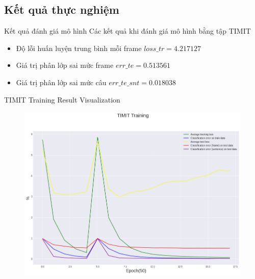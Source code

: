 \documentclass[notheorems, aspectratio=54]{beamer}
\begin{document}
\subsection{Kết quả thực nghiệm}
\begin{frame}{Kết quả đánh giá mô hình}
	Các kết quả khi đánh giá mô hình bằng tập TIMIT
	\begin{itemize}
		\item Độ lỗi huấn luyện trung bình mỗi frame $loss\_tr=4.217127$
		\item Giá trị phân lớp sai mức frame $err\_te=0.513561$
		\item Giá trị phân lớp sai mức câu $err\_te\_snt =0.018038$
	\end{itemize}
\end{frame}
\begin{frame}{TIMIT Training Result Visualization}
	\begin{figure}[H]
		\includegraphics[width=0.8\linewidth]{result/sincnet_timit_plot.png}
		\label{fig:writing-thesis}
	\end{figure}
\end{frame}
\end{document}
